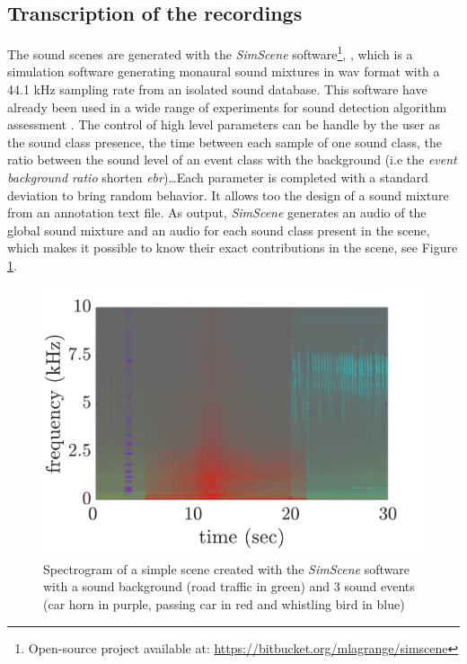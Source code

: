 \documentclass[review,5p,twocolumn,sort&compress,times]{elsarticle}
\begin{document}
\subsection{Transcription of the recordings}\label{part:simScene}
The sound scenes are generated with the \textit{SimScene} software\footnote{Open-source project available at: \url{https://bitbucket.org/mlagrange/simscene}}, \cite{rossignol_simscene:_2015}, which is a simulation software generating monaural sound mixtures in wav format with a 44.1 kHz sampling rate from an isolated sound database. 
This software have already been used in a wide range of experiments for sound detection algorithm assessment \cite{lafay_new_2014, benetos2016detection}. The control of high level parameters can be handle by the user as the sound class presence, the time between each sample of one sound class, the ratio between the sound level of an event class with the background (i.e the \textit{event background ratio} shorten \textit{ebr})\dots Each parameter is completed with a standard deviation to bring random behavior. It allows too the design of a sound mixture from an annotation text file. 
As output, \textit{SimScene} generates an audio of the global sound mixture and an audio for each sound class present in the scene, which makes it possible to know their exact contributions in the scene, see Figure \ref{fig:example_simScene}. 

\begin{figure}[t]
    \centering
       \includegraphics[width=.8\linewidth]{./figures/exampleSimScene.pdf}
    \caption{Spectrogram of a simple scene created with the \textit{SimScene} software with a sound background (road traffic in green) and 3 sound events (car horn in purple, passing car in red and whistling bird in blue)} 
    \label{fig:example_simScene}
\end{figure}
\end{document}
